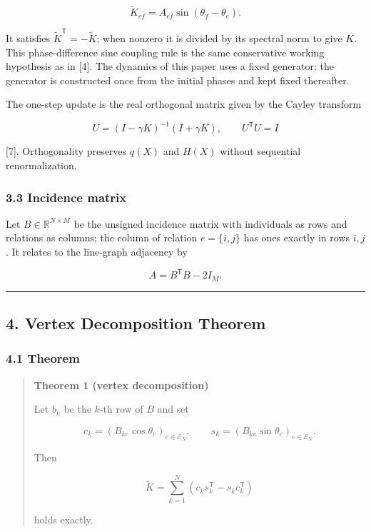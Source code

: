 \documentclass[
  a4paper,
]{article}
\begin{document}
\[
\widetilde K_{ef}
=
A_{ef}\sin(\theta_f-\theta_e).
\]

It satisfies \(\widetilde K^{\mathsf T}=-\widetilde K\); when nonzero it
is divided by its spectral norm to give \(K\). This phase-difference
sine coupling rule is the same conservative working hypothesis as in
{[}4{]}. The dynamics of this paper uses a fixed generator: the
generator is constructed once from the initial phases and kept fixed
thereafter.

The one-step update is the real orthogonal matrix given by the Cayley
transform

\[
U=(I-\gamma K)^{-1}(I+\gamma K),
\qquad
U^{\mathsf T}U=I
\]

{[}7{]}. Orthogonality preserves \(q(X)\) and \(H(X)\) without
sequential renormalization.

\subsubsection{3.3 Incidence matrix}\label{incidence-matrix}

Let \(B\in\mathbb R^{N\times M}\) be the unsigned incidence matrix with
individuals as rows and relations as columns; the column of relation
\(e=\{i,j\}\) has ones exactly in rows \(i,j\). It relates to the
line-graph adjacency by

\[
A=B^{\mathsf T}B-2I_M.
\]

\begin{center}\rule{0.5\linewidth}{0.5pt}\end{center}

\subsection{4. Vertex Decomposition
Theorem}\label{vertex-decomposition-theorem}

\subsubsection{4.1 Theorem}\label{theorem}

\begin{quote}
\textbf{Theorem 1 (vertex decomposition)}

Let \(b_k\) be the \(k\)-th row of \(B\) and set

\[
c_k=(B_{ke}\cos\theta_e)_{e\in\mathcal E_N},
\qquad
s_k=(B_{ke}\sin\theta_e)_{e\in\mathcal E_N}.
\]

Then

\[
\widetilde K=\sum_{k=1}^{N}\left(c_k s_k^{\mathsf T}-s_k c_k^{\mathsf T}\right)
\]

holds exactly.
\end{quote}
\end{document}
